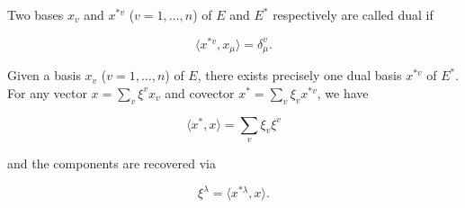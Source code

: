 Two bases $x_v$ and $x^{*v}$ ($v = 1, \ldots, n$) of $E$ and $E^*$ respectively are called dual if

$$\langle x^{*v}, x_\mu \rangle = \delta_\mu^v.$$

Given a basis $x_v$ ($v = 1, \ldots, n$) of $E$, there exists precisely one dual basis $x^{*v}$ of $E^*$. For any vector $x = \sum_v \xi^v x_v$ and covector $x^* = \sum_v \xi_v x^{*v}$, we have

$$\langle x^*, x \rangle = \sum_v \xi_v \xi^v$$

and the components are recovered via

$$\xi^\lambda = \langle x^{*\lambda}, x \rangle.$$

